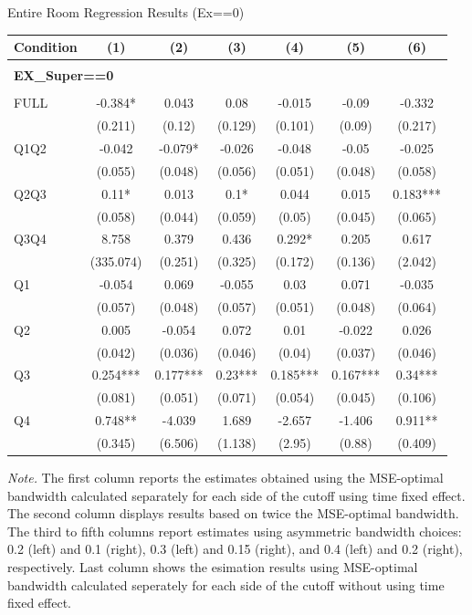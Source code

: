 \begin{table}[]
\TABLE
{Entire Room Regression Results (Ex==0) \label{result_detail2}}{\begin{tabular}{lcccccc}
\hline
Condition & (1) & (2) & (3) & (4) & (5) & (6) \\ \hline
\\ 
\multicolumn{5}{l}{\textbf{EX\_Super==0}} \\ 
\\ 
FULL & -0.384* & 0.043 & 0.08 & -0.015 & -0.09 & -0.332 \\ 
&(0.211)&(0.12) & (0.129)&(0.101)&(0.09)&(0.217)\\ 
Q1Q2 & -0.042 & -0.079* & -0.026 & -0.048 & -0.05 & -0.025 \\ 
&(0.055)&(0.048) & (0.056)&(0.051)&(0.048)&(0.058)\\ 
Q2Q3 & 0.11* & 0.013 & 0.1* & 0.044 & 0.015 & 0.183*** \\ 
&(0.058)&(0.044) & (0.059)&(0.05)&(0.045)&(0.065)\\ 
Q3Q4 & 8.758 & 0.379 & 0.436 & 0.292* & 0.205 & 0.617 \\ 
&(335.074)&(0.251) & (0.325)&(0.172)&(0.136)&(2.042)\\ 
Q1 & -0.054 & 0.069 & -0.055 & 0.03 & 0.071 & -0.035 \\ 
&(0.057)&(0.048) & (0.057)&(0.051)&(0.048)&(0.064)\\ 
Q2 & 0.005 & -0.054 & 0.072 & 0.01 & -0.022 & 0.026 \\ 
&(0.042)&(0.036) & (0.046)&(0.04)&(0.037)&(0.046)\\ 
Q3 & 0.254*** & 0.177*** & 0.23*** & 0.185*** & 0.167*** & 0.34*** \\ 
&(0.081)&(0.051) & (0.071)&(0.054)&(0.045)&(0.106)\\ 
Q4 & 0.748** & -4.039 & 1.689 & -2.657 & -1.406 & 0.911** \\ 
&(0.345)&(6.506) & (1.138)&(2.95)&(0.88)&(0.409)\\ 
\hline 
 \end{tabular}}{\textit{Note.} The first column reports the estimates obtained using the MSE-optimal bandwidth calculated separately for each side of the cutoff using time fixed effect. The second column displays results based on twice the MSE-optimal bandwidth. The third to fifth columns report estimates using asymmetric bandwidth choices: 0.2 (left) and 0.1 (right), 0.3 (left) and 0.15 (right), and 0.4 (left) and 0.2 (right), respectively. Last column shows the esimation results using MSE-optimal bandwidth calculated seperately for each side of the cutoff without using time fixed effect.}
\end{table}
